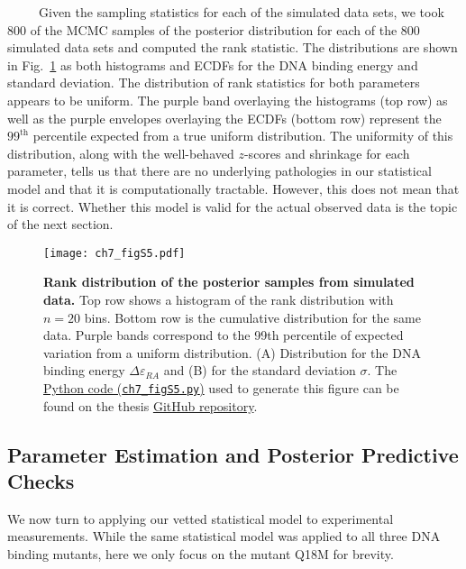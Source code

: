 \documentclass[12pt]{caltech_thesis}
\begin{document}
~~~~~Given the sampling statistics for each of the simulated data sets,
we took 800 of the MCMC samples of the posterior distribution for each
of the 800 simulated data sets and computed the rank statistic. The
distributions are shown in Fig.~\ref{fig:epRA_sbc_rank} as both
histograms and ECDFs for the DNA binding energy and standard deviation.
The distribution of rank statistics for both parameters appears to be
uniform. The purple band overlaying the histograms (top row) as well as
the purple envelopes overlaying the ECDFs (bottom row) represent the
\(99^\text{th}\) percentile expected from a true uniform distribution.
The uniformity of this distribution, along with the well-behaved
\(z\)-scores and shrinkage for each parameter, tells us that there are
no underlying pathologies in our statistical model and that it is
computationally tractable. However, this does not mean that it is
correct. Whether this model is valid for the actual observed data is the
topic of the next section.

\hypertarget{fig:epRA_sbc_rank}{%
\begin{figure}
\centering
\texttt{[image: ch7\_figS5.pdf]}
\caption[{Rank distribution of the posterior samples from simulated data
for the DNA binding energy and homoscedastic error.}]{\textbf{Rank
distribution of the posterior samples from simulated data.} Top row
shows a histogram of the rank distribution with \(n=20\) bins. Bottom
row is the cumulative distribution for the same data. Purple bands
correspond to the 99th percentile of expected variation from a uniform
distribution. (A) Distribution for the DNA binding energy
\(\Delta\varepsilon_{RA}\) and (B) for the standard deviation
\(\sigma\). The
\href{https://github.com/gchure/phd/blob/master/src/chapter_07/code/ch7_figS5.py}{Python
code (\texttt{ch7\_figS5.py})} used to generate this figure can be found
on the thesis \href{https://github.com/gchure/phd}{GitHub repository}.}
\label{fig:epRA_sbc_rank}
\end{figure}
}

\hypertarget{parameter-estimation-and-posterior-predictive-checks}{%
\subsection{Parameter Estimation and Posterior Predictive
Checks}\label{parameter-estimation-and-posterior-predictive-checks}}

We now turn to applying our vetted statistical model to experimental
measurements. While the same statistical model was applied to all three
DNA binding mutants, here we only focus on the mutant Q18M for brevity.
\end{document}
